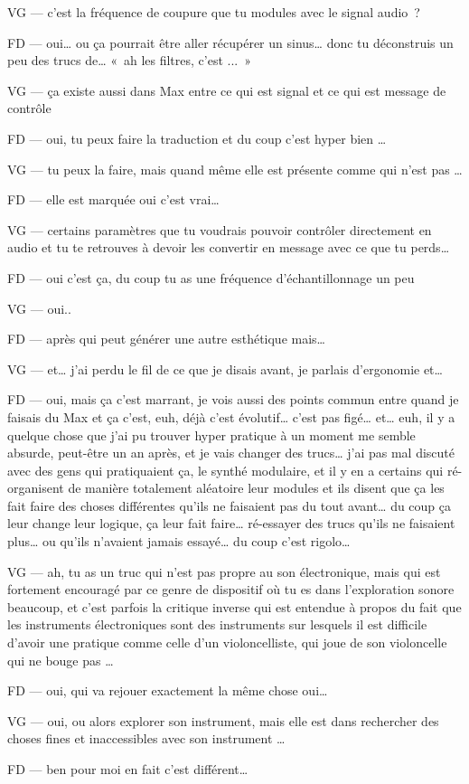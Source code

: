 VG —  c'est la fréquence de coupure que tu modules avec le signal audio ? 

FD —  oui… ou ça pourrait être aller récupérer un sinus… donc tu déconstruis un peu des trucs de…  « ah les filtres, c'est ... »  

VG —  ça existe aussi dans Max entre ce qui est signal et ce qui est message de contrôle 

FD —  oui, tu peux faire la traduction et du coup c'est hyper bien … 

VG —  tu peux la faire, mais quand même elle est présente comme qui n'est pas … 

FD —  elle est marquée oui c'est vrai… 

VG —  certains paramètres que tu voudrais pouvoir contrôler directement en audio et tu te retrouves à devoir les convertir en message avec ce que tu perds… 

FD —  oui c'est ça, du coup tu as une fréquence d'échantillonnage un peu 

VG —  oui.. 

FD —  après qui peut générer une autre esthétique mais… 

VG —  et… j'ai perdu le fil de ce que je disais avant, je parlais d'ergonomie et… 

FD —  oui, mais ça c'est marrant, je vois aussi des points commun entre quand je faisais du Max et ça c'est, euh, déjà c'est évolutif… c'est pas figé… et… euh, il y a quelque chose que j'ai pu trouver hyper pratique à un moment me semble absurde, peut-être un an après, et je vais changer des trucs… j'ai pas mal discuté avec des gens qui pratiquaient ça, le synthé modulaire, et il y en a certains qui ré-organisent de manière totalement aléatoire leur modules et ils disent que ça les fait  faire des choses différentes qu'ils ne faisaient pas du tout avant… du coup ça leur change leur logique, ça leur fait faire… ré-essayer des trucs qu'ils ne faisaient plus… ou qu'ils n'avaient jamais essayé… du coup c'est rigolo… 

VG —  ah, tu as un truc qui n'est pas propre au son électronique, mais qui est fortement encouragé par ce genre de dispositif où tu es dans l'exploration sonore beaucoup, et c'est parfois la critique inverse qui est entendue à propos du fait que les instruments électroniques sont des instruments sur lesquels il est difficile d'avoir une pratique comme celle d'un violoncelliste, qui joue de son violoncelle qui ne bouge pas … 

FD —  oui, qui va rejouer exactement la même chose oui… 

VG —  oui, ou alors explorer son instrument, mais elle est dans rechercher des choses fines et inaccessibles avec son instrument … 

FD —  ben pour moi en fait c'est différent…  